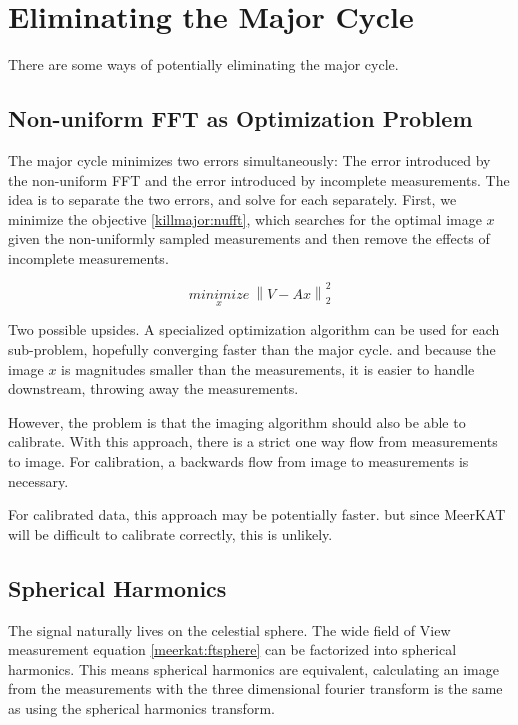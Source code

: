 \section{Eliminating the Major Cycle}\label{killmajor}

There are some ways of potentially eliminating the major cycle. 


\subsection{Non-uniform FFT as Optimization Problem}
The major cycle minimizes two errors simultaneously: The error introduced by the non-uniform FFT and the error introduced by incomplete measurements. The idea is to separate the two errors, and solve for each separately. First, we minimize the objective \eqref{killmajor:nufft}, which searches for the optimal image $x$ given the non-uniformly sampled measurements and then remove the effects of incomplete measurements.

\begin{equation}\label{killmajor:nufft}
\underset{x}{minimize} \: \left \| V - Ax \right \|_2^2
\end{equation}

Two possible upsides. A specialized optimization algorithm can be used for each sub-problem, hopefully converging faster than the major cycle. and because the image $x$ is magnitudes smaller than the measurements, it is easier to handle downstream, throwing away the measurements.

However, the problem is that the imaging algorithm should also be able to calibrate. With this approach, there is a strict one way flow from measurements to image. For calibration, a backwards flow from image to measurements is necessary.

For calibrated data, this approach may be potentially faster. but since MeerKAT will be difficult to calibrate correctly, this is unlikely.


\subsection{Spherical Harmonics}
The signal naturally lives on the celestial sphere. The wide field of View measurement equation \eqref{meerkat:ftsphere} can be factorized into spherical harmonics. This means spherical harmonics are equivalent, calculating an image from the measurements with the three dimensional fourier transform is the same as using the spherical harmonics transform.


